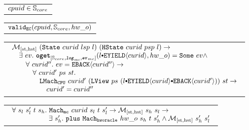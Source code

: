 \begin{hypothesis}
\begin{tabular}{P{0.95\textwidth}}
$cpuid \in {\mathbb{S}_{core}}$
\end{tabular}
\end{hypothesis}

\begin{hypothesis}
\begin{tabular}{P{0.95\textwidth}}
${{\mathrm{\texttt{valid}}}_{{\mathrm{\texttt{EC}}}}}({cpuid}, {{\mathbb{S}_{core}}}, {hw\_o})$
\end{tabular}
\end{hypothesis}

\begin{hypothesis}
\begin{tabular}{P{0.95\textwidth}}
$
\begin{array}{l}
\matchstatehstate{(\mcstate{curid}{lsp}{l})}{(\hstate{curid}{psp}{l})} \rightarrow \\
\ \ \ \exists\ ev .\ \oget{\coreset}{\mclog}{\mcevent}{\listconsoppo{\yieldev{curid}}{l}}{hw\_o}{ev} \wedge \\
\ \ \ \ \ \ \forall \ curid'' . \ ev = \yieldbackev{curid''} \rightarrow\\
\ \ \ \ \ \ \ \ \  \forall \ curid' \ ps \ st . \\
\ \ \ \ \ \ \ \ \ \ \ \ \hardwarelocalstep{curid'}{(\localview{ps}{(\listconsoppo{\yieldbackev{curid'}}{\listconsoppo{\yieldev{curid}}{l}})})}{st} \rightarrow\\
\ \ \ \ \ \ \ \ \ \ \ \ \ \ \ curid' = curid'' \\
\end{array}
$
\end{tabular}
\end{hypothesis}


\begin{lemma}
\begin{tabular}{P{0.95\textwidth}}
$
\begin{array}{l}
\forall \ s_l \ s_l' \ t \ s_h . \ {{{{\mathrm{\texttt{Mach}}}_{\mathrm{\texttt{mc}}}}}~{curid}~{s_l}~{t}~{s_l'}} \rightarrow  {{\mathcal{M}_{[\mathrm{st},\mathrm{hst}]}}~{s_h}~{s_l}} \rightarrow \\
\ \ \ \ \ \ \ \ \ \ \ \ \ \ \ \ \exists\ s_h' . \  {{{\mathrm{\texttt{plus}}}}~{{{{{\mathrm{\texttt{Mach}}}_{{\mathrm{\texttt{hworacle}}}}}}~{hw\_o}~{s_h}~{t}~{s_h'}}}} \wedge  {{\mathcal{M}_{[\mathrm{st},\mathrm{hst}]}}~{s_h'}~{s_l'}}\\
\end{array}
$
\end{tabular}
\end{lemma}

